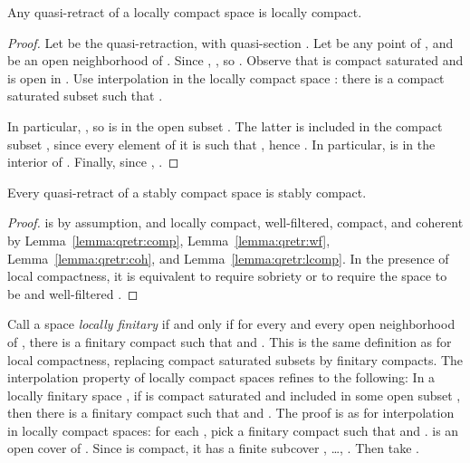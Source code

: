 \documentclass{LMCS}
\begin{document}
\begin{lem}
  \label{lemma:qretr:lcomp}
  Any quasi-retract  of a locally compact space  is locally
  compact.
\end{lem}
\begin{proof}
  Let  be the quasi-retraction, with quasi-section .  Let  be any point of , and  be an open
  neighborhood of .  Since , , so .  Observe that  is compact saturated and  is open in .  Use
  interpolation in the locally compact space : there is a compact
  saturated subset  such that .

  In particular, , so  is in the
  open subset .  The latter is
  included in the compact subset , since every element
   of it is such that , hence .  In particular,  is in the interior of .  Finally, since , .
\end{proof}

\begin{prop}
  \label{prop:qretr:scomp}
  Every  quasi-retract  of a stably compact space  is
  stably compact.
\end{prop}
\begin{proof}
   is  by assumption, and locally compact, well-filtered,
  compact, and coherent by Lemma~\ref{lemma:qretr:comp},
  Lemma~\ref{lemma:qretr:wf}, Lemma~\ref{lemma:qretr:coh}, and
  Lemma~\ref{lemma:qretr:lcomp}.  In the presence of local
  compactness, it is equivalent to require sobriety or to require the
  space to be  and well-filtered
  \cite[Theorem~II-1.21]{GHKLMS:contlatt}.
\end{proof}

Call a space  \emph{locally finitary} if and only if for every  and every open neighborhood  of , there is a finitary
compact  such that  and .  This is the same definition as for local compactness,
replacing compact saturated subsets by finitary compacts.  The
interpolation property of locally compact spaces refines to the
following: In a locally finitary space , if  is compact
saturated and included in some open subset , then there is a
finitary compact  such that 
and .  The proof is as for interpolation in
locally compact spaces: for each , pick a finitary compact
 such that  and .   is an open cover
of .  Since  is compact, it has a finite subcover ,
\ldots, .  Then take .
\end{document}
